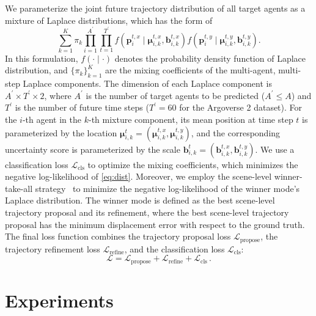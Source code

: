 \documentclass[10pt,twocolumn,letterpaper]{article}
\begin{document}
We parameterize the joint future trajectory distribution of all target agents as a mixture of Laplace distributions, which has the form of
\begin{equation}
\sum_{k=1}^K \pi_{k} \prod_{i=1}^{A^{\prime}} \prod_{t=1}^{T^{\prime}} f\left(\mathbf{p}_i^{t, x} \mid \boldsymbol{\mu}_{i, k}^{t, x}, \mathbf{b}_{i, k}^{t, x}\right) f\left(\mathbf{p}_i^{t, y} \mid \boldsymbol{\mu}_{i, k}^{t, y}, \mathbf{b}_{i, k}^{t, y}\right).
\label{eq:dist}
\end{equation}
In this formulation, $f(\cdot \mid \cdot)$ denotes the probability density function of Laplace distribution, and $\{\pi_{k}\}_{k=1}^{K}$ are the mixing coefficients of the multi-agent, multi-step Laplace components. The dimension of each Laplace component is $A^{\prime} \times T^{\prime} \times 2$, where $A^{\prime}$ is the number of target agents to be predicted ($A^{\prime} \leq A$) and $T^{\prime}$ is the number of future time steps ($T^{\prime} = 60$ for the Argoverse 2 dataset). For the $i$-th agent in the $k$-th mixture component, its mean position at time step $t$ is parameterized by the location $\boldsymbol{\mu}_{i, k}^t = (\boldsymbol{\mu}_{i, k}^{t, x}, \boldsymbol{\mu}_{i, k}^{t, y})$, and the corresponding uncertainty score is parameterized by the scale $\mathbf{b}_{i, k}^t = (\mathbf{b}_{i, k}^{t, x}, \mathbf{b}_{i, k}^{t, y})$. We use a classification loss $\mathcal{L}_{\text{cls}}$ to optimize the mixing coefficients, which minimizes the negative log-likelihood of \cref{eq:dist}. Moreover, we employ the scene-level winner-take-all strategy~\cite{ngiam2021scene} to minimize the negative log-likelihood of the winner mode's Laplace distribution. The winner mode is defined as the best scene-level trajectory proposal and its refinement, where the best scene-level trajectory proposal has the minimum displacement error with respect to the ground truth. The final loss function combines the trajectory proposal loss $\mathcal{L}_{\text{propose}}$, the trajectory refinement loss $\mathcal{L}_{\text{refine}}$, and the classification loss $\mathcal{L}_{\text{cls}}$:
\begin{equation}
\mathcal{L}=\mathcal{L}_{\text{propose}}+\mathcal{L}_{\text{refine}}+ \mathcal{L}_{\text{cls}}\,.
\label{eq:loss}
\end{equation}

\section{Experiments}
\end{document}
